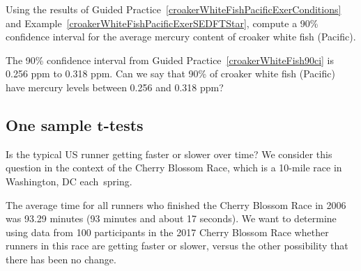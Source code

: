 \begin{exercisewrap}
\begin{nexercise}
\label{croakerWhiteFish90ci}
Using the results of Guided Practice~\ref{croakerWhiteFishPacificExerConditions} and Example~\ref{croakerWhiteFishPacificExerSEDFTStar}, compute a 90\% confidence interval for the average mercury content of croaker white fish (Pacific).\footnotemark{}
\end{nexercise}
\end{exercisewrap}

\begin{exercisewrap}
\begin{nexercise}
The 90\% confidence interval from
Guided Practice~\ref{croakerWhiteFish90ci}
is 0.256 ppm to 0.318 ppm.
Can we say that 90\% of croaker white fish (Pacific)
have mercury levels between 0.256 and 0.318 ppm?\footnotemark{}
\end{nexercise}
\end{exercisewrap}



\subsection{One sample $\mathbf{t}$-tests}
\label{oneSampleTTests}

\newcommand{\cherryblossomn}{100}
\newcommand{\cherryblossommean}{97.32}
\newcommand{\cherryblossomnull}{93.29}
\newcommand{\cherryblossomsd}{16.98}
\newcommand{\cherryblossomse}{1.70}
\newcommand{\cherryblossomz}{2.37}

Is the typical US runner getting faster or slower over time? We consider this question in the context of the Cherry Blossom Race, which is a 10-mile race in Washington, DC each~spring.

The average time for all runners who finished the Cherry Blossom Race in 2006 was 93.29 minutes (93 minutes and about 17 seconds). We want to determine using data from \cherryblossomn{} participants in the 2017 Cherry Blossom Race whether runners in this race are getting faster or slower, versus the other possibility that there has been no change.

